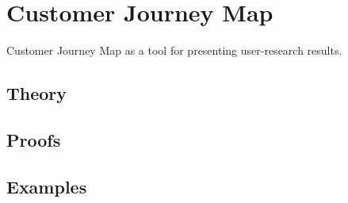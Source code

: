 
\section{Customer Journey Map}
\label{sec:2.6.14-customer-journey-map}

\begin{ticket}
Customer Journey Map as a tool for presenting user-research results.
\end{ticket}

\subsection*{Theory}

\subsection*{Proofs}

\subsection*{Examples}
